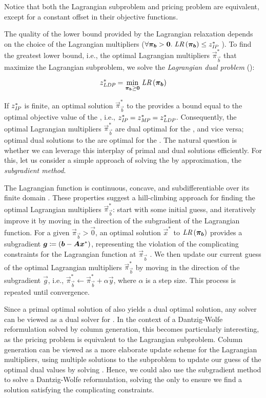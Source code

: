 Notice that both the Lagrangian subproblem and pricing problem are equivalent, except for a constant offset in their objective functions.

The quality of the lower bound provided by the Lagrangian relaxation depends on the choice of the Lagrangian multipliers ($\forall \vec{\pi}_\vec{b} > \vec{0}. \; \LR{\vec{\pi}_\vec{b}} \leq z^*_\IP{}$ \cite{thebook}). To find the greatest lower bound, i.e., the optimal Lagrangian multipliers $\vec{\pi}_\vec{b}^*$ that maximize the Lagrangian subproblem, we solve the \textit{Lagrangian dual problem} (\LDP{}):

\begin{equation*}
z^*_\LDP{} = \underset{\vec{\pi}_\vec{b} \geq \vec{0}}{\min} \; \LR{\vec{\pi}_\vec{b}}
\end{equation*}

If $z^*_{\textit{IP}}{}$ is finite, an optimal solution $\vec{\pi}_\vec{b}^*$ to the \LDP{} provides a bound equal to the optimal objective value of the \MP{}, i.e., $z^*_{\textit{IP}}{} = z^*_{\textit{MP}}{} = z^*_{\textit{LDP}}{}$. Consequently, the optimal Lagrangian multipliers $\vec{\pi}_\vec{b}^*$ are dual optimal for the \MP{}, and vice versa; optimal dual solutions to the \MP{} are optimal for the \LDP{} \cite{thebook}. The natural question is whether we can leverage this interplay of primal and dual solutions efficiently. For this, let us consider a simple approach of solving the \LDP{} by approximation, the \textit{subgradient method}.

The Lagrangian function \LR{} is continuous, concave, and subdifferentiable over its finite domain \cite{thebook}. These properties suggest a hill-climbing approach for finding the optimal Lagrangian multipliers $\vec{\pi}_\vec{b}^*$: start with some initial guess, and iteratively improve it by moving in the direction of the subgradient of the Lagrangian function. For a given $\vec{\pi}_\vec{b} > \vec{0}$, an optimal solution $\vec{x}^*$ to $\LR{\vec{\pi}_\vec{b}}$ provides a subgradient ${\bm{g}} \coloneqq ({\bm{b}} - {\bm{A}} {\bm{x}}^*)$, representing the violation of the complicating constraints for the Lagrangian function at $\vec{\pi}_\vec{b}$ \cite{thebook}. We then update our current guess of the optimal Lagrangian multipliers $\vec{\pi}_\vec{b}^*$ by moving in the direction of the subgradient $\vec{g}$, i.e., $\vec{\pi}_\vec{b}^* \leftarrow \vec{\pi}_\vec{b}^* + \alpha \vec{y}$, where $\alpha$ is a step size. This process is repeated until convergence.

Since a primal optimal solution of \IP{} also yields a dual optimal solution, any \IP{} solver can be viewed as a dual solver for \LDP{}. In the context of a Dantzig-Wolfe reformulation solved by column generation, this becomes particularly interesting, as the pricing problem is equivalent to the Lagrangian subproblem. Column generation can be viewed as a more elaborate update scheme for the Lagrangian multipliers, using multiple solutions to the subproblem to update our guess of the optimal dual values by solving \MP{} \cite{thebook}. Hence, we could also use the subgradient method to solve a Dantzig-Wolfe reformulation, solving the \MP{} only to ensure we find a solution satisfying the complicating constraints.

